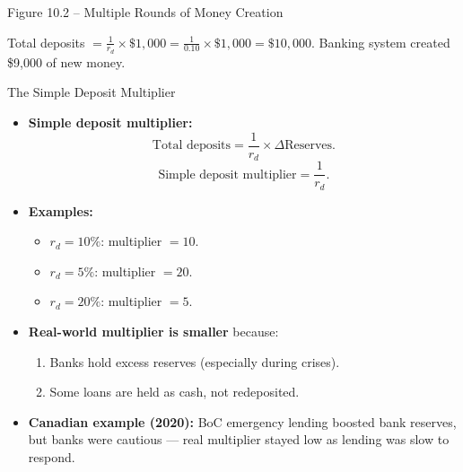 \documentclass[aspectratio=169]{beamer}
\begin{document}
\begin{frame}{Figure 10.2 -- Multiple Rounds of Money Creation}
\begin{center}
\end{center}
{\tiny Total deposits $= \frac{1}{r_d} \times \$1{,}000 = \frac{1}{0.10} \times \$1{,}000 = \$10{,}000$. Banking system created \$9{,}000 of new money.}
\end{frame}

\begin{frame}{The Simple Deposit Multiplier}
\transfade
\begin{itemize}[<+->]
  \item \textbf{Simple deposit multiplier:}
  \[
    \text{Total deposits} = \frac{1}{r_d} \times \Delta \text{Reserves}.
  \]
  \[
    \text{Simple deposit multiplier} = \frac{1}{r_d}.
  \]
  \item \textbf{Examples:}
  \begin{itemize}[<+->]
    \item $r_d = 10\%$: multiplier $= 10$.
    \item $r_d = 5\%$: multiplier $= 20$.
    \item $r_d = 20\%$: multiplier $= 5$.
  \end{itemize}
  \item \textbf{Real-world multiplier is smaller} because:
  \begin{enumerate}[<+->]
    \item Banks hold excess reserves (especially during crises).
    \item Some loans are held as cash, not redeposited.
  \end{enumerate}
  \item \textbf{Canadian example (2020):} BoC emergency lending boosted bank reserves, but banks were cautious --- real multiplier stayed low as lending was slow to respond.
\end{itemize}
\end{frame}
\end{document}
